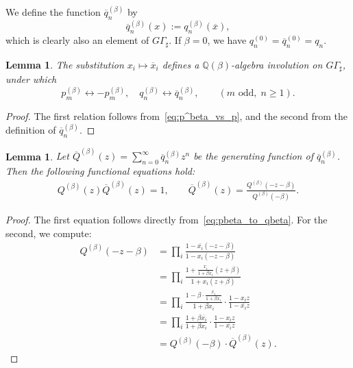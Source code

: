 \documentclass[dvipdfmx]{amsart}
\newtheorem{lemma}[thm]{Lemma}
\theoremstyle{definition}
\theoremstyle{remark}
\begin{document}
We define the function \( \overline{q}_n^{(\beta)} \) by
\[
\overline{q}_n^{(\beta)}(x) := q_n^{(\beta)}(\overline{x}),
\]
which is clearly also an element of \( G\Gamma_\sharp \).
If $\beta=0$, we have $q_n^{(0)}=\overline{q}_n^{(0)}=q_n$.

\begin{lemma}\label{lemma:involution}
The substitution \( x_i \mapsto \overline{x}_i \) defines a \( \mathbb{Q}(\beta) \)-algebra involution on \( G\Gamma_\sharp \), under which
\[
p_m^{(\beta)} \leftrightarrow -p_m^{(\beta)}, \quad
q_n^{(\beta)} \leftrightarrow \overline{q}_n^{(\beta)}, \qquad (m\text{ odd},\; n \geq 1).
\]
\end{lemma}

\begin{proof}
The first relation follows from~\eqref{eq:p^beta_vs_p}, and the second from the definition of \( \overline{q}_n^{(\beta)} \).
\end{proof}

\begin{lemma}\label{lemma:func_rel_Q}
Let \( \overline{Q}^{(\beta)}(z) = \sum_{n=0}^\infty \overline{q}_n^{(\beta)} z^n \) be the generating function of \( \overline{q}_n^{(\beta)} \). Then the following functional equations hold:
\begin{gather}
Q^{(\beta)}(z) \overline{Q}^{(\beta)}(z) = 1, \qquad
\overline{Q}^{(\beta)}(z) = \frac{Q^{(\beta)}(-z - \beta)}{Q^{(\beta)}(-\beta)}.
\end{gather}
\end{lemma}

\begin{proof}
The first equation follows directly from~\eqref{eq:pbeta_to_qbeta}. For the second, we compute:
\[
\begin{aligned}
Q^{(\beta)}(-z - \beta)
&= \prod_i \frac{1 - \overline{x_i}(-z - \beta)}{1 - x_i(-z - \beta)} \\
&= \prod_i \frac{1 + \frac{x_i}{1 + \beta x_i}(z + \beta)}{1 + x_i(z + \beta)} \\
&= \prod_i \frac{1 - \beta \cdot \frac{x_i}{1 + \beta x_i}}{1 + \beta x_i}
\cdot \frac{1 - x_i z}{1 - \overline{x_i} z} \\
&= \prod_i \frac{1 + \beta \overline{x_i}}{1 + \beta x_i}
\cdot \frac{1 - x_i z}{1 - \overline{x_i} z} \\
&= Q^{(\beta)}(-\beta) \cdot \overline{Q}^{(\beta)}(z).
\end{aligned}
\]
\end{proof}
\end{document}
